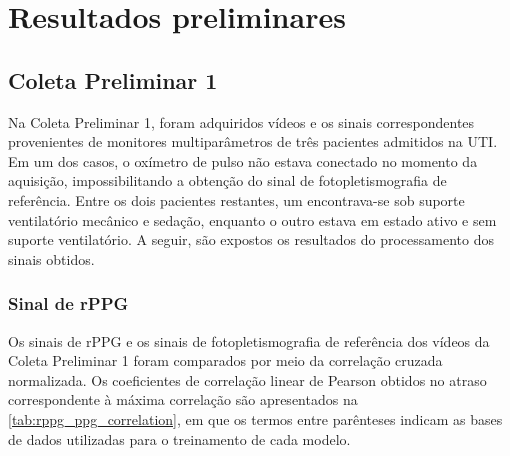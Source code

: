 \chapter{Resultados preliminares}
\label{cap:results}

\section{Coleta Preliminar 1}

Na Coleta Preliminar 1, foram adquiridos vídeos e os sinais correspondentes provenientes de monitores multiparâmetros de três pacientes admitidos na UTI. Em um dos casos, o oxímetro de pulso não estava conectado no momento da aquisição, impossibilitando a obtenção do sinal de fotopletismografia de referência. Entre os dois pacientes restantes, um encontrava-se sob suporte ventilatório mecânico e sedação, enquanto o outro estava em estado ativo e sem suporte ventilatório. A seguir, são expostos os resultados do processamento dos sinais obtidos. 


\subsection{Sinal de rPPG}

Os sinais de rPPG e os sinais de fotopletismografia de referência dos vídeos da Coleta Preliminar 1 foram comparados por meio da correlação cruzada normalizada. Os coeficientes de correlação linear de Pearson obtidos no atraso correspondente à máxima correlação são apresentados na \autoref{tab:rppg_ppg_correlation}, em que os termos entre parênteses indicam as bases de dados utilizadas para o treinamento de cada modelo.

